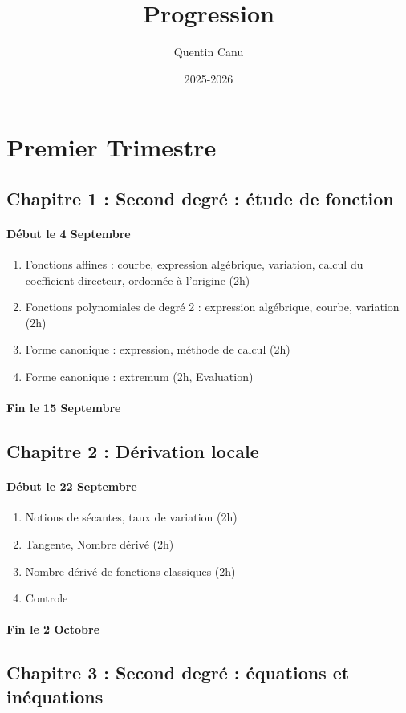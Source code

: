 \documentclass{article}
\title{Progression}
\author{Quentin Canu}
\date{2025-2026}
\begin{document}
\maketitle
\section{Premier Trimestre}
\subsection*{Chapitre 1 : Second degré : étude de fonction}
\paragraph*{Début le 4 Septembre}
\begin{enumerate}
\item Fonctions affines : courbe, expression algébrique, variation, calcul du coefficient directeur, ordonnée à l'origine (2h)
\item Fonctions polynomiales de degré 2 : expression algébrique, courbe, variation (2h)
\item Forme canonique : expression, méthode de calcul (2h)
\item Forme canonique : extremum (2h, Evaluation)
\end{enumerate}
\paragraph*{Fin le 15 Septembre}
\subsection*{Chapitre 2 : Dérivation locale}
\paragraph*{Début le 22 Septembre}
\begin{enumerate}
\item Notions de sécantes, taux de variation (2h)
\item Tangente, Nombre dérivé (2h)
\item Nombre dérivé de fonctions classiques (2h)
\item Controle 
\end{enumerate}
\paragraph*{Fin le 2 Octobre}
\subsection*{Chapitre 3 : Second degré : équations et inéquations}
\end{document}
